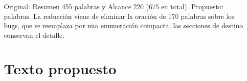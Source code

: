 Original: Resumen 455 palabras y Alcance 220 (675 en total). Propuesto: palabras. La reducción viene de eliminar la oración de 170 palabras sobre los bugs, que se reemplaza por una enumeración compacta; las secciones de destino conservan el detalle.

\section{Texto propuesto}

\begin{propuesto}

\end{propuesto}




